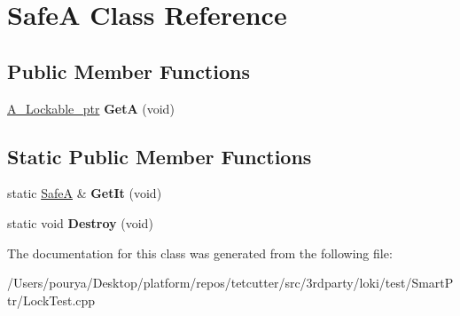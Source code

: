 \hypertarget{classSafeA}{}\section{Safe\+A Class Reference}
\label{classSafeA}
\subsection*{Public Member Functions}
\begin{DoxyCompactItemize}
\item 
\hypertarget{classSafeA_aa70967bde52a7a626d53ff1968937cb4}{}\hyperlink{classLoki_1_1StrongPtr}{A\+\_\+\+Lockable\+\_\+ptr} {\bfseries Get\+A} (void)\label{classSafeA_aa70967bde52a7a626d53ff1968937cb4}

\end{DoxyCompactItemize}
\subsection*{Static Public Member Functions}
\begin{DoxyCompactItemize}
\item 
\hypertarget{classSafeA_a984014e6cd39b09e9688b0ab87fce066}{}static \hyperlink{classSafeA}{Safe\+A} \& {\bfseries Get\+It} (void)\label{classSafeA_a984014e6cd39b09e9688b0ab87fce066}

\item 
\hypertarget{classSafeA_a70db570d675334352fca12b8b361f134}{}static void {\bfseries Destroy} (void)\label{classSafeA_a70db570d675334352fca12b8b361f134}

\end{DoxyCompactItemize}


The documentation for this class was generated from the following file\+:\begin{DoxyCompactItemize}
\item 
/\+Users/pourya/\+Desktop/platform/repos/tetcutter/src/3rdparty/loki/test/\+Smart\+Ptr/Lock\+Test.\+cpp\end{DoxyCompactItemize}
